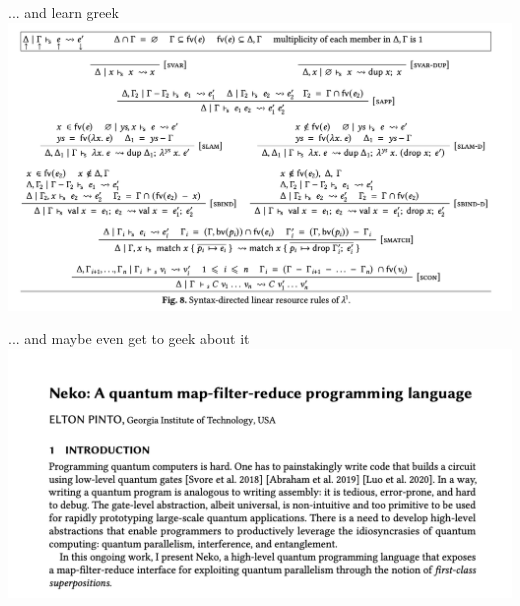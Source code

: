 \documentclass{beamer}
\begin{document}
\begin{frame}{... and learn greek}
  \includegraphics[width=\textwidth]{assets/greek-example}
\end{frame}

\begin{frame}{... and maybe even get to geek about it}
  \includegraphics[width=\textwidth]{assets/neko-lang-example}
\end{frame}
\end{document}

